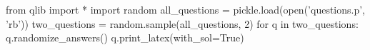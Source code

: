 \documentclass[a4paper]{article}
\begin{document}
\begin{pycode}
from qlib import *
import random
all_questions = pickle.load(open('questions.p', 'rb'))
two_questions = random.sample(all_questions, 2)
for q in two_questions:
	q.randomize_answers()
	q.print_latex(with_sol=True)
\end{pycode}
\end{document}
